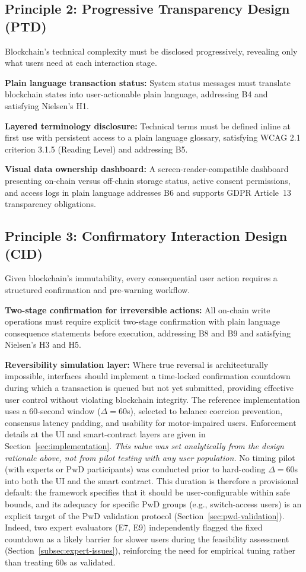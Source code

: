 \documentclass[journal,onecolumn]{IEEEtran}
\begin{document}
\subsection{Principle 2: Progressive Transparency Design (PTD)}

Blockchain's technical complexity must be disclosed progressively, revealing only what users need at each interaction stage.

\textbf{Plain language transaction status:} System status messages must translate blockchain states into user-actionable plain language, addressing B4 and satisfying Nielsen's H1.

\textbf{Layered terminology disclosure:} Technical terms must be defined inline at first use with persistent access to a plain language glossary, satisfying WCAG 2.1 criterion 3.1.5 (Reading Level) and addressing B5.

\textbf{Visual data ownership dashboard:} A screen-reader-compatible dashboard presenting on-chain versus off-chain storage status, active consent permissions, and access logs in plain language addresses B6 and supports GDPR Article~13 transparency obligations.

\subsection{Principle 3: Confirmatory Interaction Design (CID)}

Given blockchain's immutability, every consequential user action requires a structured confirmation and pre-warning workflow.

\textbf{Two-stage confirmation for irreversible actions:} All on-chain write operations must require explicit two-stage confirmation with plain language consequence statements before execution, addressing B8 and B9 and satisfying Nielsen's H3 and H5.

\textbf{Reversibility simulation layer:} Where true reversal is architecturally impossible, interfaces should implement a time-locked confirmation countdown during which a transaction is queued but not yet submitted, providing effective user control without violating blockchain integrity. The reference implementation uses a 60-second window ($\Delta = 60$s), selected to balance coercion prevention, consensus latency padding, and usability for motor-impaired users. Enforcement details at the UI and smart-contract layers are given in Section~\ref{sec:implementation}. \emph{This value was set analytically from the design rationale above, not from pilot testing with any user population.} No timing pilot (with experts or PwD participants) was conducted prior to hard-coding $\Delta = 60$s into both the UI and the smart contract. This duration is therefore a provisional default: the framework specifies that it should be user-configurable within safe bounds, and its adequacy for specific PwD groups (e.g., switch-access users) is an explicit target of the PwD validation protocol (Section~\ref{sec:pwd-validation}). Indeed, two expert evaluators (E7, E9) independently flagged the fixed countdown as a likely barrier for slower users during the feasibility assessment (Section~\ref{subsec:expert-issues}), reinforcing the need for empirical tuning rather than treating 60s as validated.
\end{document}
